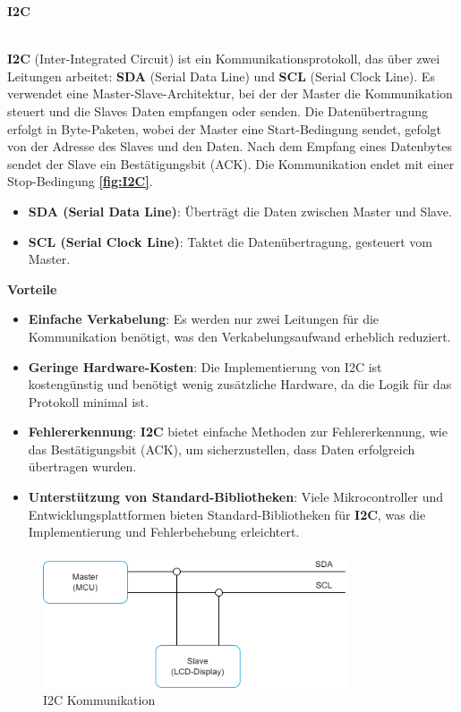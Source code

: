 \hypertarget{I2C_target}{\textbf{I2C}} \\

\textbf{I2C}\cite{ic2-reference} (Inter-Integrated Circuit) ist ein Kommunikationsprotokoll, das über zwei Leitungen arbeitet: \textbf{SDA} (Serial Data Line) und \textbf{SCL} (Serial Clock Line). Es verwendet eine Master-Slave-Architektur, bei der der Master die Kommunikation steuert und die Slaves Daten empfangen oder senden. Die Datenübertragung erfolgt in Byte-Paketen, wobei der Master eine Start-Bedingung sendet, gefolgt von der Adresse des Slaves und den Daten. Nach dem Empfang eines Datenbytes sendet der Slave ein Bestätigungsbit (ACK). Die Kommunikation endet mit einer Stop-Bedingung \textbf{\autoref{fig:I2C}}. \\

\begin{itemize}
	\item \textbf{SDA (Serial Data Line)}: Überträgt die Daten zwischen Master und Slave.
	\item \textbf{SCL (Serial Clock Line)}: Taktet die Datenübertragung, gesteuert vom Master.
\end{itemize}


\textbf{Vorteile}\\

\begin{itemize}
	\item \textbf{Einfache Verkabelung}: Es werden nur zwei Leitungen für die Kommunikation benötigt, was den Verkabelungsaufwand erheblich reduziert.
	\item \textbf{Geringe Hardware-Kosten}: Die Implementierung von I2C ist kostengünstig und benötigt wenig zusätzliche Hardware, da die Logik für das Protokoll minimal ist.
	\item \textbf{Fehlererkennung}: \textbf{I2C} bietet einfache Methoden zur Fehlererkennung, wie das Bestätigungsbit (ACK), um sicherzustellen, dass Daten erfolgreich übertragen wurden.
	\item \textbf{Unterstützung von Standard-Bibliotheken}: Viele Mikrocontroller und Entwicklungsplattformen bieten Standard-Bibliotheken für \textbf{I2C}, was die Implementierung und Fehlerbehebung erleichtert.
\end{itemize}

\begin{figure}[H]
	\centering
	\includegraphics[width=0.8\textwidth]{images/08_durchfuehrung/interface/I2C.drawio.png}
	\caption{I2C Kommunikation}
	\label{fig:I2C}
\end{figure}

